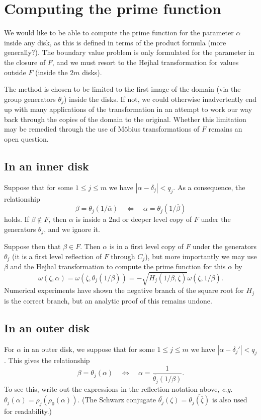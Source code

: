 \documentclass[12pt,fleqn]{article}
\newcommand{\conj}[1]{\overline{#1}}
\begin{document}
\section{Computing the prime function}
We would like to be able to compute the prime function for the parameter $\alpha$ inside any disk, as this is defined in terms of the product formula (more generally?). The boundary value problem is only formulated for the parameter in the closure of $F$, and we must resort to the Hejhal transformation for values outside $F$ (inside the $2m$ disks).

The method is chosen to be limited to the first image of the domain (via the group generators $\theta_j$) inside the disks. If not, we could otherwise inadvertently end up with many applications of the transformation in an attempt to work our way back through the copies of the domain to the original. Whether this limitation may be remedied through the use of M\"obius transformations of $F$ remains an open question. 

\subsection{In an inner disk}
Suppose that for some $1\le j\le m$ we have $|\alpha - \delta_j| < q_j$. As a consequence, the relationship
\begin{equation}
  \beta = \theta_j(1/\conj{\alpha}) \quad\Leftrightarrow\quad \alpha = \theta_j(1/\conj{\beta})
\end{equation}
holds. If $\beta\notin F$, then $\alpha$ is inside a 2nd or deeper level copy of $F$ under the generators $\theta_j$, and we ignore it.

Suppose then that $\beta\in F$. Then $\alpha$ is in a first level copy of $F$ under the generators $\theta_j$ (it is a first level reflection of $F$ through $C_j$), but more importantly we may use $\beta$ and the Hejhal transformation to compute the prime function for this $\alpha$ by
\begin{equation}
  \omega(\zeta,\alpha) = \omega(\zeta,\theta_j(1/\conj{\beta})) = -\sqrt{H_j(1/\conj{\beta},\zeta)} \omega(\zeta,1/\conj{\beta}).
\end{equation}
Numerical experiments have shown the negative branch of the square root for $H_j$ is the correct branch, but an analytic proof of this remains undone.

\subsection{In an outer disk}
For $\alpha$ in an outer disk, we suppose that for some $1\le j\le m$ we have $|\alpha - \delta_j'| < q_j$. This gives the relationship
\begin{equation}
  \beta = \theta_j(\alpha) \quad\Leftrightarrow\quad \alpha = \frac{1}{\conj{\theta_j}(1/\beta)}.
\end{equation}
To see this, write out the expressions in the reflection notation above, \textit{e.g.} $\theta_j(\alpha) = \rho_j(\rho_0(\alpha))$. (The Schwarz conjugate $\conj{\theta_j}(\zeta) = \conj{\theta_j(\conj{\zeta})}$ is also used for readability.)
\end{document}
